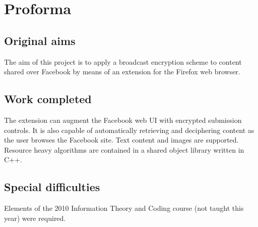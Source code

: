 
\bigskip

\begingroup
\let\clearpage\relax
\let\cleardoublepage\relax
\let\cleardoublepage\relax
\chapter*{Proforma}


\section*{Original aims}

The aim of this project is to apply a broadcast encryption scheme to content shared over Facebook by means of an extension for the Firefox web browser.


\section*{Work completed}

The extension can augment the Facebook web UI with encrypted submission controls. It is also capable of automatically retrieving and deciphering content as the user browses the Facebook site. Text content and images are supported. Resource heavy algorithms are contained in a shared object library written in C++.


\section*{Special difficulties}

Elements of the 2010 Information Theory and Coding course (not taught this year) were required.

\endgroup



